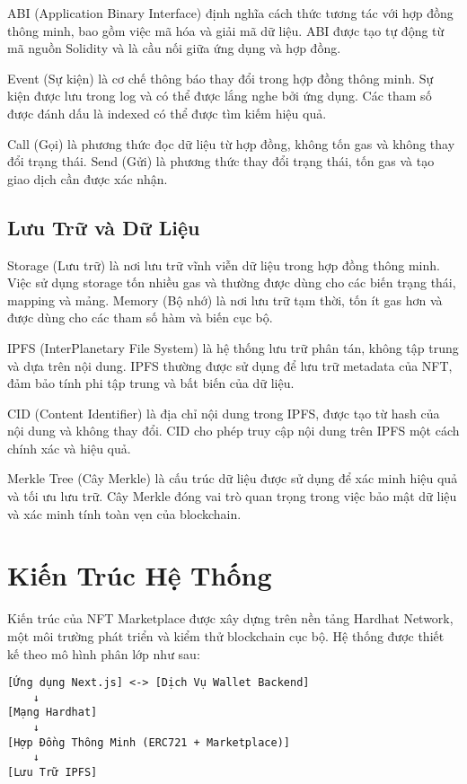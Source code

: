 ABI (Application Binary Interface) định nghĩa cách thức tương tác với hợp đồng thông minh, bao gồm việc mã hóa và giải mã dữ liệu. ABI được tạo tự động từ mã nguồn Solidity và là cầu nối giữa ứng dụng và hợp đồng.

Event (Sự kiện) là cơ chế thông báo thay đổi trong hợp đồng thông minh. Sự kiện được lưu trong log và có thể được lắng nghe bởi ứng dụng. Các tham số được đánh dấu là indexed có thể được tìm kiếm hiệu quả.

Call (Gọi) là phương thức đọc dữ liệu từ hợp đồng, không tốn gas và không thay đổi trạng thái. Send (Gửi) là phương thức thay đổi trạng thái, tốn gas và tạo giao dịch cần được xác nhận.

\subsection{Lưu Trữ và Dữ Liệu}
Storage (Lưu trữ) là nơi lưu trữ vĩnh viễn dữ liệu trong hợp đồng thông minh. Việc sử dụng storage tốn nhiều gas và thường được dùng cho các biến trạng thái, mapping và mảng. Memory (Bộ nhớ) là nơi lưu trữ tạm thời, tốn ít gas hơn và được dùng cho các tham số hàm và biến cục bộ.

IPFS (InterPlanetary File System) là hệ thống lưu trữ phân tán, không tập trung và dựa trên nội dung. IPFS thường được sử dụng để lưu trữ metadata của NFT, đảm bảo tính phi tập trung và bất biến của dữ liệu.

CID (Content Identifier) là địa chỉ nội dung trong IPFS, được tạo từ hash của nội dung và không thay đổi. CID cho phép truy cập nội dung trên IPFS một cách chính xác và hiệu quả.

Merkle Tree (Cây Merkle) là cấu trúc dữ liệu được sử dụng để xác minh hiệu quả và tối ưu lưu trữ. Cây Merkle đóng vai trò quan trọng trong việc bảo mật dữ liệu và xác minh tính toàn vẹn của blockchain.

\section{Kiến Trúc Hệ Thống}
Kiến trúc của NFT Marketplace được xây dựng trên nền tảng Hardhat Network, một môi trường phát triển và kiểm thử blockchain cục bộ. Hệ thống được thiết kế theo mô hình phân lớp như sau:

\begin{verbatim}
[Ứng dụng Next.js] <-> [Dịch Vụ Wallet Backend]
    ↓
[Mạng Hardhat]
    ↓
[Hợp Đồng Thông Minh (ERC721 + Marketplace)]
    ↓
[Lưu Trữ IPFS]
\end{verbatim}

